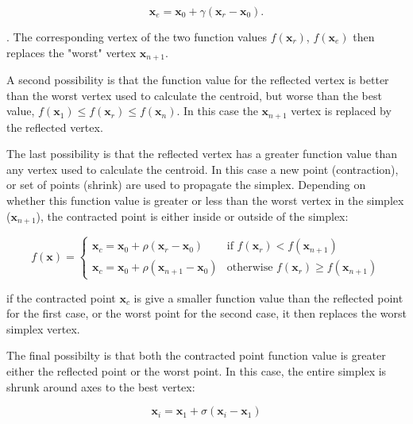 \begin{equation}
\mathbf{x}_e = \mathbf{x}_0 + \gamma\left(\mathbf{x}_r - \mathbf{x}_0 \right).
\end{equation}

. The corresponding vertex of the two function values $f\left(\mathbf{x}_r\right)$, 
$f\left(\mathbf{x}_e\right)$ then replaces the "worst" vertex $\mathbf{x}_{n+1}$.

A second possibility is that the function value for the reflected vertex is better
than the worst vertex used to calculate the centroid, but worse than the best 
value, $f\left(\mathbf{x}_1\right) \leq f\left(\mathbf{x}_r\right) \leq f\left(\mathbf{x}_n\right)$.
In this case the $\mathbf{x}_{n+1}$ vertex is replaced by the reflected vertex.

The last possibility is that the reflected vertex has a greater function value than
any vertex used to calculate the centroid. In this case a new point (contraction),
or set of points (shrink) are used to propagate the simplex. Depending on whether
this function value is greater or less than the worst vertex in the simplex ($\mathbf{x}_{n+1}$),
the contracted point is either inside or outside of the simplex:

\begin{equation}
    f\left(\mathbf{x}\right)= 
    \begin{cases}
    \mathbf{x}_c = \mathbf{x}_0 + \rho \left(\mathbf{x}_r - \mathbf{x}_0 \right)               & \text{if } f\left(\mathbf{x}_r\right) < f\left(\mathbf{x}_{n+1}\right)\\
    \mathbf{x}_c = \mathbf{x}_0 + \rho \left(\mathbf{x}_{n+1} - \mathbf{x}_0 \right)           & \text{otherwise } f\left(\mathbf{x}_r\right) \geq f\left(\mathbf{x}_{n+1}\right)
    \end{cases}
\end{equation}

if the contracted point $\mathbf{x}_c$ is give a smaller function value than the 
reflected point for the first case, or the worst point for the second case, it then
replaces the worst simplex vertex.

The final possibilty is that both the contracted point function value is greater 
either the reflected point or the worst point. In this case, the entire simplex
is shrunk around axes to the best vertex:

\begin{equation}
\mathbf{x}_i = \mathbf{x}_1 + \sigma \left(\mathbf{x}_i - \mathbf{x}_1 \right)
\end{equation}

